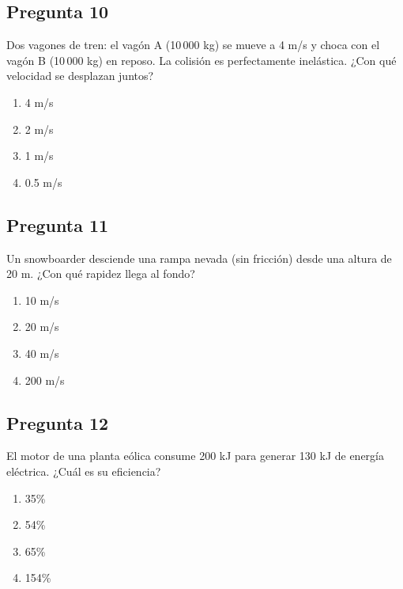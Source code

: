 \begin{preguntabox}
\subsection{Pregunta 10}
Dos vagones de tren: el vagón A (10\,000 kg) se mueve a 4 m/s y choca con el vagón B (10\,000 kg) en reposo. La colisión es perfectamente inelástica. ¿Con qué velocidad se desplazan juntos?

\begin{enumerate}
    \item[A)] 4 m/s
    \item[B)] 2 m/s
    \item[C)] 1 m/s
    \item[D)] 0.5 m/s
\end{enumerate}
\end{preguntabox}


\begin{preguntabox}
\subsection{Pregunta 11}
Un snowboarder desciende una rampa nevada (sin fricción) desde una altura de 20 m. ¿Con qué rapidez llega al fondo?

\begin{enumerate}
    \item[A)] 10 m/s
    \item[B)] 20 m/s
    \item[C)] 40 m/s
    \item[D)] 200 m/s
\end{enumerate}
\end{preguntabox}

\begin{preguntabox}
\subsection{Pregunta 12}
El motor de una planta eólica consume 200 kJ para generar 130 kJ de energía eléctrica. ¿Cuál es su eficiencia?

\begin{enumerate}
    \item[A)] 35\%
    \item[B)] 54\%
    \item[C)] 65\%
    \item[D)] 154\%
\end{enumerate}
\end{preguntabox}

